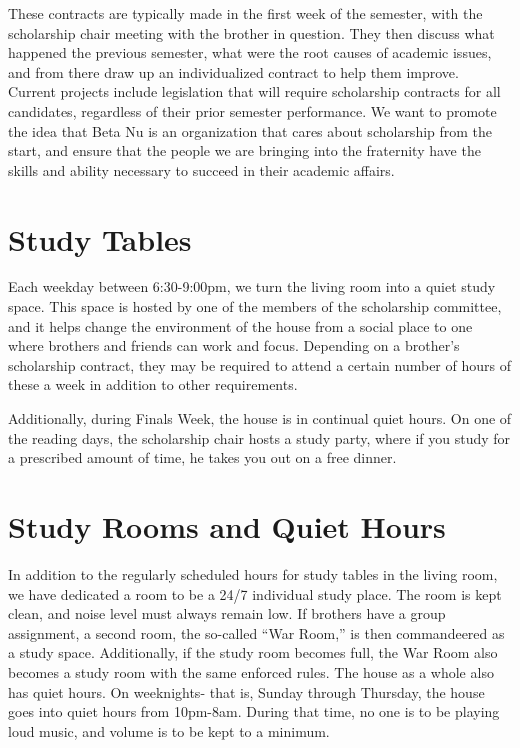     These contracts are typically made in the first week of the semester, with the scholarship chair meeting with the brother in question. They then discuss what happened the previous semester, what were the root causes of academic issues, and from there draw up an individualized contract to help them improve. \\

    Current projects include legislation that will require scholarship contracts for all candidates, regardless of their prior semester performance. We want to promote the idea that Beta Nu is an organization that cares about scholarship from the start, and ensure that the people we are bringing into the fraternity have the skills and ability necessary to succeed in their academic affairs.    
    
  \section*{Study Tables}
    Each weekday between 6:30-9:00pm, we turn the living room into a quiet study space. This space is hosted by one of the members of the scholarship committee, and it helps change the environment of the house from a social place to one where brothers and friends can work and focus. Depending on a brother's scholarship contract, they may be required to attend a certain number of hours of these a week in addition to other requirements. 
    
    Additionally, during Finals Week, the house is in continual quiet hours. On one of the reading days, the scholarship chair hosts a study party, where if you study for a prescribed amount of time, he takes you out on a free dinner.
    
  \section*{Study Rooms and Quiet Hours}
    In addition to the regularly scheduled hours for study tables in the living room, we have dedicated a room to be a 24/7 individual study place. The room is kept clean, and noise level must always remain low. If brothers have a group assignment, a second room, the so-called “War Room,” is then commandeered as a study space. Additionally, if the study room becomes full, the War Room also becomes a study room with the same enforced rules.  The house as a whole also has quiet hours. On weeknights- that is, Sunday through Thursday, the house goes into quiet hours from 10pm-8am. During that time, no one is to be playing loud music, and volume is to be kept to a minimum.
    

